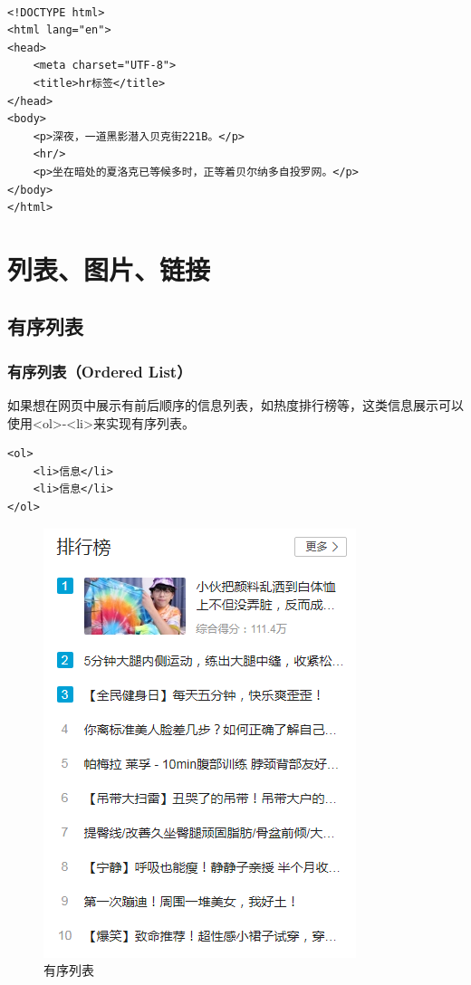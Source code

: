  \\

\begin{lstlisting}[style=htmlcssjs]
<!DOCTYPE html>
<html lang="en">
<head>
    <meta charset="UTF-8">
    <title>hr标签</title>
</head>
<body>
    <p>深夜，一道黑影潜入贝克街221B。</p>
    <hr/>
    <p>坐在暗处的夏洛克已等候多时，正等着贝尔纳多自投罗网。</p>
</body>
</html>
\end{lstlisting}

\newpage

\chapter{列表、图片、链接}

\section{有序列表}

\subsection{有序列表（Ordered List）}

如果想在网页中展示有前后顺序的信息列表，如热度排行榜等，这类信息展示可以使用<ol>-<li>来实现有序列表。 \\

\begin{lstlisting}[style=htmlcssjs]
<ol>
    <li>信息</li>
    <li>信息</li>
</ol>
\end{lstlisting}

\begin{figure}[H]
	\centering
	\includegraphics[scale=0.7]{img/C3/3-1/1.png}
	\caption{有序列表}
\end{figure}

